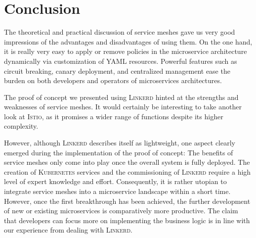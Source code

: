 \section{Conclusion}

The theoretical and practical discussion of service meshes gave us very good impressions of the advantages and disadvantages of using them.
On the one hand, it is really very easy to apply or remove policies in the microservice architecture dynamically via customization of YAML resources. Powerful features such as circuit breaking, canary deployment, and centralized management ease the burden on both developers and operators of microservices architectures.

The proof of concept we presented using \textsc{Linkerd} hinted at the strengths and weaknesses of service meshes. It would certainly be interesting to take another look at \textsc{Istio}, as it promises a wider range of functions despite its higher complexity.

However, although \textsc{Linkerd} describes itself as lightweight, one aspect clearly emerged during the implementation of the proof of concept: The benefits of service meshes only come into play once the overall system is fully deployed. The creation of \textsc{Kubernetes} services and the commissioning of \textsc{Linkerd} require a high level of expert knowledge and effort. Consequently, it is rather utopian to integrate service meshes into a microservice landscape within a short time. However, once the first breakthrough has been achieved, the further development of new or existing microservices is comparatively more productive. The claim that developers can focus more on implementing the business logic is in line with our experience from dealing with \textsc{Linkerd}.